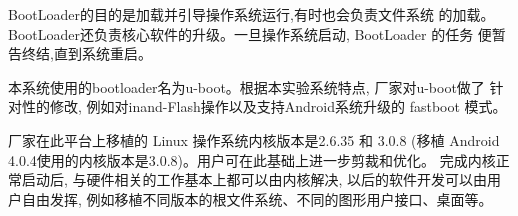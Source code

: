 BootLoader的目的是加载并引导操作系统运行,有时也会负责文件系统
的加载。BootLoader还负责核心软件的升级。一旦操作系统启动, BootLoader 的任务
便暂告终结,直到系统重启。

本系统使用的bootloader名为u-boot。根据本实验系统特点, 厂家对u-boot做了
针对性的修改, 例如对inand-Flash操作以及支持Android系统升级的 fastboot 模式。

厂家在此平台上移植的 Linux 操作系统内核版本是2.6.35 和 3.0.8 (移植
Android 4.0.4使用的内核版本是3.0.8)。用户可在此基础上进一步剪裁和优化。
完成内核正常启动后,
与硬件相关的工作基本上都可以由内核解决, 以后的软件开发可以由用户自由发挥,
例如移植不同版本的根文件系统、不同的图形用户接口、桌面等。
